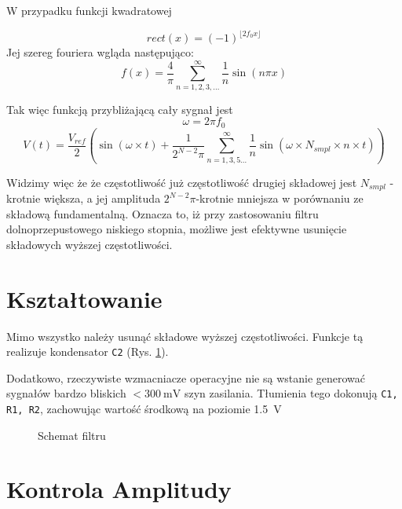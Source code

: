 \documentclass[12pt, a4paper]{article}
\begin{document}
\begin{lemma}
	W przypadku funkcji kwadratowej
	
	\begin{equation}
		rect(x) = (-1)^{\lfloor	2 f_0 x \rfloor}
	\end{equation}
	Jej szereg fouriera wgląda następująco:
	\begin{equation}
			f(x) = \frac{4}{\pi} \sum_{n=1,2,3,...}^{\infty} \frac{1}{n} \sin \left( n \pi x \right)
	\end{equation}
\end{lemma}

\begin{theorem}
Tak więc funkcją przybliżającą cały sygnał jest
	\begin{equation}
		\omega = 2 \pi f_0 
	\end{equation}
	\begin{equation}
		V(t) = \frac{V_{ref}}{2} \left( \sin \left( \omega \times t \right) + \frac{1}{ 2^{N - 2}\pi} \sum_{n=1,3,5...}^{\infty} \frac{1}{n} \sin \left( \omega \times N_{smpl} \times n \times t \right) \right)
	\end{equation}
\end{theorem}
\fi

Widzimy więc że że częstotliwość już częstotliwość drugiej składowej jest $N_{smpl}$ - krotnie większa, a jej amplituda $2^{N -2}\pi$-krotnie mniejsza w porównaniu ze składową fundamentalną.
Oznacza to, iż przy zastosowaniu filtru dolnoprzepustowego niskiego stopnia, możliwe jest efektywne usunięcie składowych wyższej częstotliwości.

\section{Kształtowanie}
Mimo wszystko należy usunąć składowe wyższej częstotliwości. Funkcje tą realizuje kondensator \verb|C2| (Rys. \ref{fig:filter}).

Dodatkowo, rzeczywiste wzmacniacze operacyjne nie są wstanie generować sygnałów bardzo bliskich $<\qty{300}{\mV}$ szyn zasilania.
Tłumienia tego dokonują \verb|C1, R1, R2|, zachowując wartość środkową na poziomie \qty{1,5}{\V}

\begin{figure}[h]
	\centering
	
	\caption{Schemat filtru}
	\label{fig:filter}
\end{figure}


\section{Kontrola Amplitudy}
\end{document}
